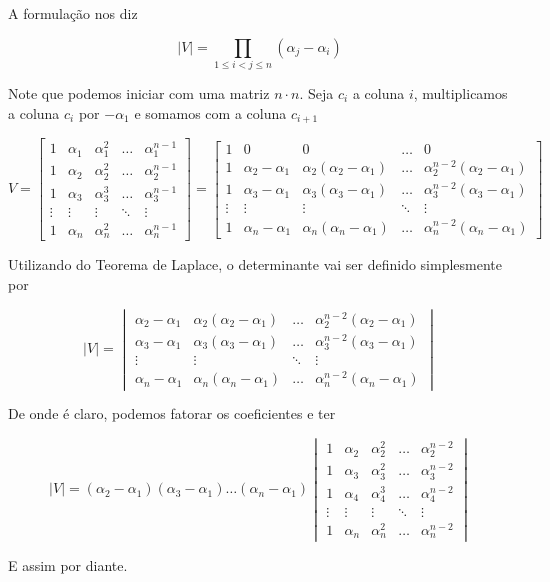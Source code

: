 A formulação nos diz

\begin{equation}
	|V| = \prod_{1\leq i < j \leq n} (\alpha_j - \alpha_i)
\end{equation}

Note que podemos iniciar com uma matriz $n\cdot n$. Seja $c_i$ a coluna $i$, multiplicamos a coluna $c_i$ por $-\alpha_1$ e somamos com a coluna $c_{i+1}$

\[
V = 
\begin{bmatrix}
	1 & \alpha_1 & \alpha_1^2 & \dots & \alpha_1^{n-1} \\
	1 & \alpha_2 & \alpha_2^2 & \dots & \alpha_2^{n-1} \\
	1 & \alpha_3 & \alpha_3^3 & \dots & \alpha_3^{n-1} \\
	\vdots & \vdots & \vdots & \ddots & \vdots \\
	1 & \alpha_n & \alpha_n^2 & \dots & \alpha_n^{n-1}
\end{bmatrix}
=
\begin{bmatrix}
	1 & 0 & 0 & \dots & 0 \\
	1 & \alpha_2 - \alpha_1 & \alpha_2(\alpha_2 - \alpha_1) & \dots & \alpha_2^{n-2}(\alpha_2 - \alpha_1) \\
	1 & \alpha_3 - \alpha_1& \alpha_3(\alpha_3 - \alpha_1) & \dots & \alpha_3^{n-2} (\alpha_3 - \alpha_1)\\
	\vdots & \vdots & \vdots & \ddots & \vdots \\
	1 & \alpha_n- \alpha_1 & \alpha_n(\alpha_n - \alpha_1) & \dots & \alpha_n^{n-2}(\alpha_n - \alpha_1)
\end{bmatrix}
\]

Utilizando do Teorema de Laplace, o determinante vai ser definido simplesmente por

\[
|V| =
	\begin{vmatrix}
		\alpha_2 - \alpha_1 & \alpha_2(\alpha_2 - \alpha_1) & \dots & \alpha_2^{n-2}(\alpha_2 - \alpha_1) \\
		\alpha_3 - \alpha_1& \alpha_3(\alpha_3 - \alpha_1) & \dots & \alpha_3^{n-2} (\alpha_3 - \alpha_1)\\
		\vdots & \vdots & \ddots & \vdots \\
		\alpha_n- \alpha_1 & \alpha_n(\alpha_n - \alpha_1) & \dots & \alpha_n^{n-2}(\alpha_n - \alpha_1)
	\end{vmatrix}
\]

De onde é claro, podemos fatorar os coeficientes e ter

\[
|V| = (\alpha_2 - \alpha_1)(\alpha_3 - \alpha_1)\dots(\alpha_n - \alpha_1)
\begin{vmatrix}
	1 & \alpha_2 & \alpha_2^2 & \dots & \alpha_2^{n-2} \\
	1 & \alpha_3 & \alpha_3^2 & \dots & \alpha_3^{n-2} \\
	1 & \alpha_4 & \alpha_4^3 & \dots & \alpha_4^{n-2} \\
	\vdots & \vdots & \vdots & \ddots & \vdots \\
	1 & \alpha_n & \alpha_n^2 & \dots & \alpha_n^{n-2}
\end{vmatrix}
\]

E assim por diante.
